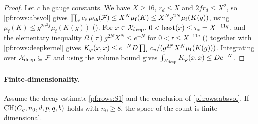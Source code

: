 \begin{proof}
Let $c$ be gauge constants. We have $X\ge16$, $r_d\le X$ and $2fr_d\le X^2$, so \cref{pf:rows:absvol} gives
$\prod_vc_v\,\mu_{\A}(\mathcal F)\le X^N\mu_{\mathrm f}(K)\le X^Ng^{2N}\mu_{\mathrm f}(K(g))$, using
$\mu_{\mathrm f}(K)\le g^{2n^2f}\mu_{\mathrm f}(K(g))$ (). For $x\in\mathcal{X}_{\mathrm{deep}}$,
$0<\operatorname{least}(x)\le\tau_*=X^{-11q}$, and the elementary inequality $\Omega(\tau)g^{2N}X^N\le e^{-N}$ for $0<\tau\le X^{-11q}$
() together with \cref{pf:rows:deepkernel} gives
$K_\varphi(x,x)\le e^{-N}D\prod_vc_v/(g^{2N}X^N\mu_{\mathrm f}(K(g)))$. Integrating over $\mathcal{X}_{\mathrm{deep}}\subseteq\mathcal F$ and using the
volume bound gives $\int_{\mathcal{X}_{\mathrm{deep}}}K_\varphi(x,x)\le D e^{-N}$.
\end{proof}

\paragraph{Finite-dimensionality.}

\begin{lemma}\label{pf:rows:findim}
Assume the decay estimate \ref{pf:rows:S1} and the conclusion of \cref{pf:rows:absvol}. If
$\mathrm{CH}(C_g,n_0,d,p,q,b)$ holds with $n_0\ge8$, the space of the count is finite-dimensional.
\end{lemma}

